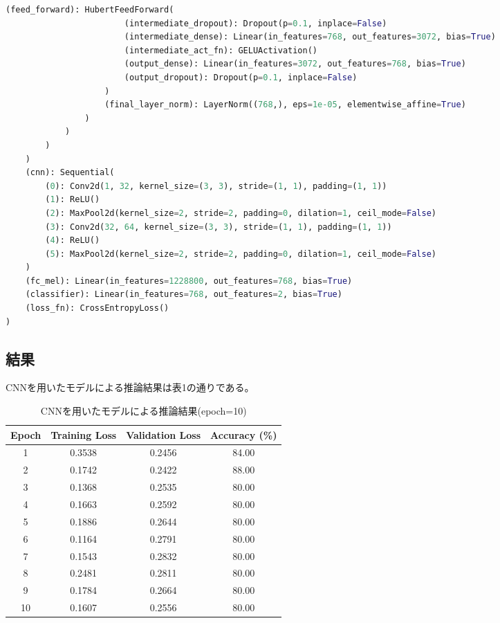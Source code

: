 \documentclass[10pt]{ltjsarticle}
\begin{document}
\begin{lstlisting}[language=Python]
                    (feed_forward): HubertFeedForward(
                        (intermediate_dropout): Dropout(p=0.1, inplace=False)
                        (intermediate_dense): Linear(in_features=768, out_features=3072, bias=True)
                        (intermediate_act_fn): GELUActivation()
                        (output_dense): Linear(in_features=3072, out_features=768, bias=True)
                        (output_dropout): Dropout(p=0.1, inplace=False)
                    )
                    (final_layer_norm): LayerNorm((768,), eps=1e-05, elementwise_affine=True)
                )
            )
        )
    )
    (cnn): Sequential(
        (0): Conv2d(1, 32, kernel_size=(3, 3), stride=(1, 1), padding=(1, 1))
        (1): ReLU()
        (2): MaxPool2d(kernel_size=2, stride=2, padding=0, dilation=1, ceil_mode=False)
        (3): Conv2d(32, 64, kernel_size=(3, 3), stride=(1, 1), padding=(1, 1))
        (4): ReLU()
        (5): MaxPool2d(kernel_size=2, stride=2, padding=0, dilation=1, ceil_mode=False)
    )
    (fc_mel): Linear(in_features=1228800, out_features=768, bias=True)
    (classifier): Linear(in_features=768, out_features=2, bias=True)
    (loss_fn): CrossEntropyLoss()
)
\end{lstlisting}

\subsection{結果}

CNNを用いたモデルによる推論結果は表1の通りである。
\vspace{5pt}
\begin{table}[h]
\centering
\caption{CNNを用いたモデルによる推論結果(epoch=10)}
\begin{tabular}{cccc}
\toprule
Epoch & Training Loss & Validation Loss & Accuracy (\%) \\
\midrule
1 & 0.3538 & 0.2456 & 84.00 \\
2 & 0.1742 & 0.2422 & 88.00 \\
3 & 0.1368 & 0.2535 & 80.00 \\
4 & 0.1663 & 0.2592 & 80.00 \\
5 & 0.1886 & 0.2644 & 80.00 \\
6 & 0.1164 & 0.2791 & 80.00 \\
7 & 0.1543 & 0.2832 & 80.00 \\
8 & 0.2481 & 0.2811 & 80.00 \\
9 & 0.1784 & 0.2664 & 80.00 \\
10 & 0.1607 & 0.2556 & 80.00 \\
\bottomrule
\end{tabular}
\end{table}
\end{document}

